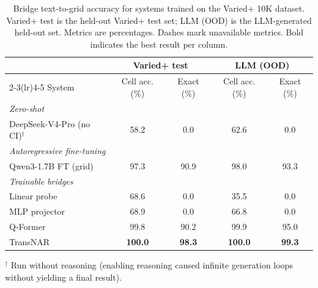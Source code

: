 \documentclass[11pt]{article}
\begin{document}
\begin{table}[!t]
\centering
\caption{Bridge text-to-grid accuracy for systems trained on the Varied+ 10K dataset. Varied+ test is the held-out Varied+ test set; LLM (OOD) is the LLM-generated held-out set. Metrics are percentages. Dashes mark unavailable metrics. Bold indicates the best result per column.}
\label{tab:bridge_variedplus}
\begin{tabular}{lcccc}
\toprule
& \multicolumn{2}{c}{Varied+ test} & \multicolumn{2}{c}{LLM (OOD)} \\
\cmidrule(lr){2-3}\cmidrule(lr){4-5}
System & Cell acc. (\%) & Exact (\%) & Cell acc. (\%) & Exact (\%) \\
\midrule
\multicolumn{5}{l}{\textit{Zero-shot}} \\
\midrule
DeepSeek-V4-Pro (no CI)$^\dagger$ & 58.2 & 0.0 & 62.6 & 0.0 \\
\midrule
\multicolumn{5}{l}{\textit{Autoregressive fine-tuning}} \\
\midrule
Qwen3-1.7B FT (grid)          & 97.3 & 90.9 & 98.0 & 93.3 \\
\midrule
\multicolumn{5}{l}{\textit{Trainable bridges}} \\
\midrule
Linear probe  & 68.6 & 0.0 & 35.5 & 0.0 \\
MLP projector & 68.9 & 0.0 & 66.8 & 0.0 \\
Q-Former      & 99.8 & 90.2 & 99.9 & 95.0 \\
TransNAR      & \textbf{100.0} & \textbf{98.3} & \textbf{100.0} & \textbf{99.3} \\
\bottomrule
\end{tabular}

\vspace{0.5em}
\noindent\small $^\dagger$ Run without reasoning (enabling reasoning caused infinite generation loops without yielding a final result).
\end{table}
\end{document}
